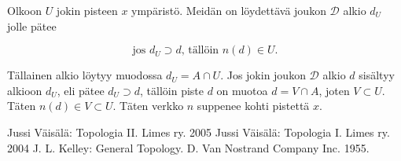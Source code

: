 \documentclass[12pt,a4paper,leqno]{report}
\newcommand{\D}{\mathcal{D}}
\theoremstyle{plain}
\theoremstyle{definition}
\theoremstyle{remark}
\begin{document}
Olkoon $U$ jokin pisteen $x$ ympäristö. Meidän on löydettävä joukon $\D$ alkio $d_U$ jolle pätee

\begin{equation}
\text{jos } d_U \supset d \text{, tällöin } n(d) \in U\text{.}
\end{equation}

Tällainen alkio löytyy muodossa $d_U = A \cap U$. Jos jokin joukon $\D$ alkio $d$ sisältyy alkioon $d_U$, eli pätee $d_U \supset d$, tällöin piste $d$ on muotoa $d = V \cap A$, joten $V \subset U$. Täten $n(d) \in V \subset U$. Täten verkko $n$ suppenee kohti pistettä $x$.

\begin{thebibliography}{9}

Jussi Väisälä: Topologia II. Limes ry. 2005
Jussi Väisälä: Topologia I. Limes ry. 2004
J. L. Kelley: General Topology. D. Van Nostrand Company Inc. 1955.
\end{thebibliography}
\end{document}
